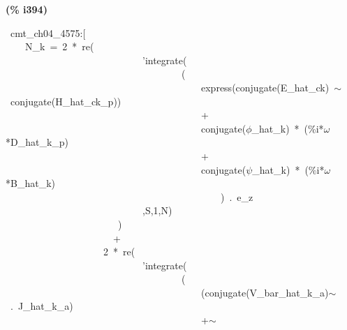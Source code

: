 \documentclass[fleqn]{article}
\begin{document}
\noindent
\begin{minipage}[t]{4.000000em}\color{red}\bfseries
(\% i394)	
\end{minipage}
\begin{minipage}[t]{\textwidth}\color{blue}
\ cmt\_ch04\_4575:[\\
\ \ \ \ N\_k\ =\ 2\ *\ re(\\
\ \ \ \ \ \ \ \ \ \ \ \ \ \ \ \ \ \ \ \ \ \ \ \ \ \ \ \ 'integrate(\ \ \ \ \ \ \ \ \ \ \ \ \\
\ \ \ \ \ \ \ \ \ \ \ \ \ \ \ \ \ \ \ \ \ \ \ \ \ \ \ \ \ \ \ \ \ \ \ \ (\\
\ \ \ \ \ \ \ \ \ \ \ \ \ \ \ \ \ \ \ \ \ \ \ \ \ \ \ \ \ \ \ \ \ \ \ \ \ \ \ \ express(conjugate(E\_hat\_ck)\ \ensuremath{\sim\ }\ conjugate(H\_hat\_ck\_p))\ \ \\
\ \ \ \ \ \ \ \ \ \ \ \ \ \ \ \ \ \ \ \ \ \ \ \ \ \ \ \ \ \ \ \ \ \ \ \ \ \ \ \ +\ \\
\ \ \ \ \ \ \ \ \ \ \ \ \ \ \ \ \ \ \ \ \ \ \ \ \ \ \ \ \ \ \ \ \ \ \ \ \ \ \ \ conjugate(\ensuremath{\phi}\_hat\_k)\ *\ (\%i*\ensuremath{\omega}*D\_hat\_k\_p)\ \ \\
\ \ \ \ \ \ \ \ \ \ \ \ \ \ \ \ \ \ \ \ \ \ \ \ \ \ \ \ \ \ \ \ \ \ \ \ \ \ \ \ +\ \\
\ \ \ \ \ \ \ \ \ \ \ \ \ \ \ \ \ \ \ \ \ \ \ \ \ \ \ \ \ \ \ \ \ \ \ \ \ \ \ \ conjugate(\ensuremath{\psi}\_hat\_k)\ *\ (\%i*\ensuremath{\omega}*B\_hat\_k)\\
\ \ \ \ \ \ \ \ \ \ \ \ \ \ \ \ \ \ \ \ \ \ \ \ \ \ \ \ \ \ \ \ \ \ \ \ \ \ \ \ \ \ \ \ )\ .\ e\_z\\
\ \ \ \ \ \ \ \ \ \ \ \ \ \ \ \ \ \ \ \ \ \ \ \ \ \ \ \ ,S,1,N)\\
\ \ \ \ \ \ \ \ \ \ \ \ \ \ \ \ \ \ \ \ \ \ \ )\\
\ \ \ \ \ \ \ \ \ \ \ \ \ \ \ \ \ \ \ \ \ \ +\\
\ \ \ \ \ \ \ \ \ \ \ \ \ \ \ \ \ \ \ \ 2\ *\ re(\\
\ \ \ \ \ \ \ \ \ \ \ \ \ \ \ \ \ \ \ \ \ \ \ \ \ \ \ \ 'integrate(\ \ \ \ \ \ \ \ \ \ \ \ \\
\ \ \ \ \ \ \ \ \ \ \ \ \ \ \ \ \ \ \ \ \ \ \ \ \ \ \ \ \ \ \ \ \ \ \ \ (\\
\ \ \ \ \ \ \ \ \ \ \ \ \ \ \ \ \ \ \ \ \ \ \ \ \ \ \ \ \ \ \ \ \ \ \ \ \ \ \ \ (conjugate(V\_bar\_hat\_k\_a)\ensuremath{\sim\ }\ .\ J\_hat\_k\_a)\ \\
\ \ \ \ \ \ \ \ \ \ \ \ \ \ \ \ \ \ \ \ \ \ \ \ \ \ \ \ \ \ \ \ \ \ \ \ \ \ \ \ +\ensuremath{\sim\ }\\

\end{minipage}
\end{document}
